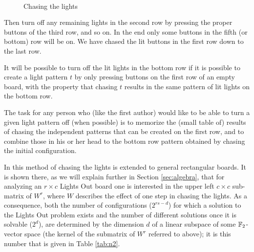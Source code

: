 \begin{figure}
  \mbox{
  }
  \caption{Chasing the lights}
  \label{chasing}
\end{figure}

Then turn off any remaining lights in the second
row by pressing the proper buttons of the third row, and so on. 
In the end only some buttons in the fifth (or bottom) row will
be on. We have chased the lit buttons in the first row down to the
last row.

It will be possible to turn off the lit lights in the bottom row
if it is possible to create a light pattern $t$ by only pressing buttons
on the first row of an empty board, with the property that chasing $t$
results in the same pattern of lit lights on the bottom row.

The task for any person who (like the first author) would
like to be able to turn a given light pattern off (when
possible) is to memorize the (small table of) results of chasing the independent
patterns that can be created on the first row, and to combine those
in his or her head to the bottom row pattern obtained by chasing
the initial configuration.

In \cite{leach17} this method of chasing the lights is extended to general
rectangular boards.  It is shown there, as we will explain further
in Section
\ref{sec:algebra}, that for analyzing an $r \times c$ Lights Out
board one is interested in the upper left $c \times c$ sub-matrix of
$W^{r}$, where $W$ describes the effect of one step in chasing the lights.
As a consequence, both the number of configurations ($2^{rs-d}$)
for which a solution to the Lights Out problem exists and the number
of different solutions once it is solvable ($2^d$), are determined
by the dimension $d$ of a linear subspace of some $\mathbb F_2$-vector space
(the kernel of the submatrix of $W^r$ referred to above); it is this number
that is given in Table \ref{tab:n2}.

